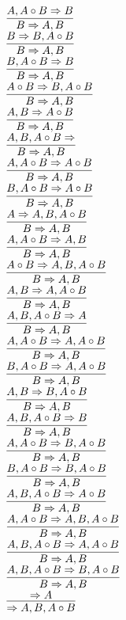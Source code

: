 \documentclass[11pt]{article}
\begin{document}
\begin{center}
\bigskip
\\$\infer{B\Rightarrow A, B}{A, A\circ B\Rightarrow B}$
\bigskip
\\$\infer{B\Rightarrow A, B}{B\Rightarrow B, A\circ B}$
\bigskip
\\$\infer{B\Rightarrow A, B}{B, A\circ B\Rightarrow B}$
\bigskip
\\$\infer{B\Rightarrow A, B}{A\circ B\Rightarrow B, A\circ B}$
\bigskip
\\$\infer{B\Rightarrow A, B}{A, B\Rightarrow A\circ B}$
\bigskip
\\$\infer{B\Rightarrow A, B}{A, B, A\circ B\Rightarrow }$
\bigskip
\\$\infer{B\Rightarrow A, B}{A, A\circ B\Rightarrow A\circ B}$
\bigskip
\\$\infer{B\Rightarrow A, B}{B, A\circ B\Rightarrow A\circ B}$
\bigskip
\\$\infer{B\Rightarrow A, B}{A\Rightarrow A, B, A\circ B}$
\bigskip
\\$\infer{B\Rightarrow A, B}{A, A\circ B\Rightarrow A, B}$
\bigskip
\\$\infer{B\Rightarrow A, B}{A\circ B\Rightarrow A, B, A\circ B}$
\bigskip
\\$\infer{B\Rightarrow A, B}{A, B\Rightarrow A, A\circ B}$
\bigskip
\\$\infer{B\Rightarrow A, B}{A, B, A\circ B\Rightarrow A}$
\bigskip
\\$\infer{B\Rightarrow A, B}{A, A\circ B\Rightarrow A, A\circ B}$
\bigskip
\\$\infer{B\Rightarrow A, B}{B, A\circ B\Rightarrow A, A\circ B}$
\bigskip
\\$\infer{B\Rightarrow A, B}{A, B\Rightarrow B, A\circ B}$
\bigskip
\\$\infer{B\Rightarrow A, B}{A, B, A\circ B\Rightarrow B}$
\bigskip
\\$\infer{B\Rightarrow A, B}{A, A\circ B\Rightarrow B, A\circ B}$
\bigskip
\\$\infer{B\Rightarrow A, B}{B, A\circ B\Rightarrow B, A\circ B}$
\bigskip
\\$\infer{B\Rightarrow A, B}{A, B, A\circ B\Rightarrow A\circ B}$
\bigskip
\\$\infer{B\Rightarrow A, B}{A, A\circ B\Rightarrow A, B, A\circ B}$
\bigskip
\\$\infer{B\Rightarrow A, B}{A, B, A\circ B\Rightarrow A, A\circ B}$
\bigskip
\\$\infer{B\Rightarrow A, B}{A, B, A\circ B\Rightarrow B, A\circ B}$
\bigskip
\\$\infer{\Rightarrow A, B, A\circ B}{\Rightarrow A}$

\end{center}
\end{document}
